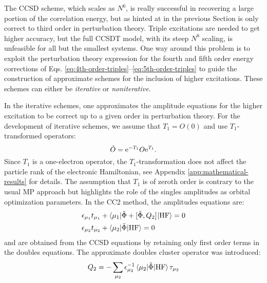 The \acrshort*{CCSD} scheme, which scales as $N^6$, is really successful
in recovering a large portion of the correlation energy, but as hinted
at in the previous Section is only correct to third order in
perturbation theory.
Triple excitations are needed to get higher accuracy, but the full
\gls{CCSDT} model, with its steep $N^8$ scaling, is unfeasible for all
but the smallest systems.
One way around this problem is to exploit the perturbation theory
expression for the fourth and fifth order energy corrections of Eqs.
\eqref{eq:4th-order-triples}--\eqref{eq:5th-order-triples} to guide the
construction of approximate schemes for the inclusion of higher
excitations. These schemes can either be \emph{iterative} or
\emph{noniterative}.

In the iterative schemes, one approximates the amplitude equations for
the higher excitation to be correct up to a given order in perturbation
theory.
For the development of iterative schemes, we assume that $T_1 = O(0)$
and use $T_1$-transformed operators:
\begin{equation}
  \check{O} = \mathrm{e}^{-T_1}O\mathrm{e}^{T_1}.
\end{equation}
Since $T_1$ is a one-electron operator, the $T_1$-transformation does
not affect the particle rank of the electronic
Hamiltonian,\autocite{Koch1994-vr, Helgaker2000-tz}
see Appendix \ref{app:mathematical-results} for details.
The assumption that $T_1$ is of zeroth order is contrary to the usual
\acrshort*{MP} approach but highlights the role of the singles
amplitudes as orbital optimization parameters.
In the \gls{CC2} method, the amplitudes equations are:\autocite{Christiansen1995-vy, Helgaker2000-tz}
\begin{subequations}\label{eq:cc2-amplitudes}
  \begin{align}
    \epsilon_{\mu_1}t_{\mu_1} &+ \braket{\mu_1 | \check{\Phi} +
    [ \check{\Phi}, Q_2 ]^{} | \mathrm{HF}} = 0
    \label{eq:cc2-singles-amplitudes} \\
    \epsilon_{\mu_2}t_{\mu_2} &+ \braket{\mu_2 | \check{\Phi} | \mathrm{HF}} = 0
    \label{eq:cc2-doubles-amplitudes}
  \end{align}
\end{subequations}
and are obtained from the \acrshort{CCSD} equations by retaining only
first order terms in the doubles equations.
The approximate doubles cluster operator was introduced:
\begin{equation}
  Q_2 = - \sum_{\mu_2}
  \epsilon_{\mu_2}^{-1}\braket{\mu_2 | \check{\Phi} | \mathrm{HF}}\tau_{\mu_2}
\end{equation}
